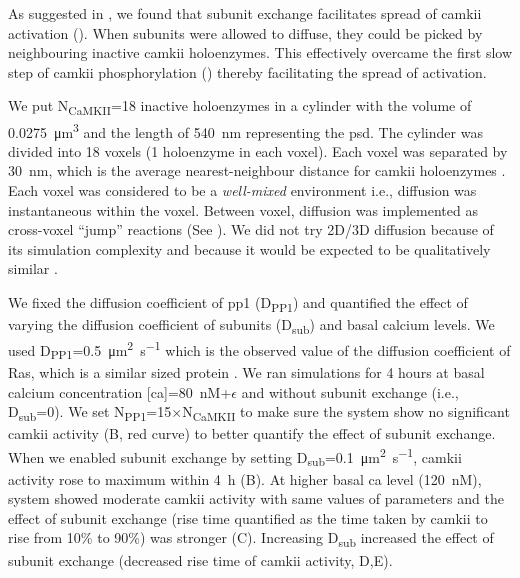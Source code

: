 \documentclass[9pt,lineno,doublespacing]{elife}
\newcommand\SUB[2]{#1\textsubscript{#2}}
\begin{document}
As suggested in \citep{stratton_activation-triggered_2014}, we found that
subunit exchange facilitates spread of \gls{camkii} activation
(). When subunits were allowed to diffuse, they
could be picked by neighbouring inactive \gls{camkii} holoenzymes.  This
effectively overcame the first slow step of \gls{camkii} phosphorylation
() thereby facilitating the spread of activation.

We put \SUB{N}{CaMKII}=18 inactive holoenzymes in a cylinder with the volume of
\SI{0.0275}{\cubic\micro\meter} and the length of \SI{540}{\nano\meter}
representing the \gls{psd}. The cylinder was divided into 18 voxels (1
holoenzyme in each voxel). Each voxel was separated by \SI{30}{\nano\meter},
which is the average nearest-neighbour distance for \gls{camkii} holoenzymes
\citep{feng_quantitative_2011}.  Each voxel was considered to be a
\emph{well-mixed} environment i.e., diffusion was instantaneous within the
voxel. Between voxel, diffusion was implemented as cross-voxel ``jump''
reactions (See ).  We did not try 2D/3D
diffusion because of its simulation complexity and because it would be expected
to be qualitatively similar \citep{fange_stochastic_2010}.

We fixed the diffusion coefficient of \gls{pp1} (\SUB{D}{PP1}) and quantified
the effect of varying the diffusion coefficient of subunits (\SUB{D}{sub}) and
basal calcium levels. We used
\SUB{D}{PP1}=\SI{0.5}{\micro\meter\squared\per\second} which is the observed
value of the diffusion coefficient of Ras, which is a similar sized protein
\citep{harvey_spread_2008}. We ran simulations for 4 hours at basal calcium
concentration [\gls{ca}]=\SI{80}{\nano M}+$\epsilon$ and without subunit exchange (i.e.,
\SUB{D}{sub}=0). We set \SUB{N}{PP1}=15$\times$\SUB{N}{CaMKII} to make sure the
system show no significant \gls{camkii} activity (B, red
curve) to better quantify the effect of subunit exchange. When we enabled
subunit exchange by setting
\SUB{D}{sub}=\SI{0.1}{\micro\meter\squared\per\second}, \gls{camkii} activity
rose to maximum within \SI{4}{\hour} (B). At
higher basal \gls{ca} level (\SI{120}{\nano M}), system showed moderate
\gls{camkii} activity with same values of parameters and the effect of subunit
exchange (rise time quantified as the time taken by \gls{camkii} to rise from
10\% to 90\%) was stronger (C). Increasing
\SUB{D}{sub} increased the effect of subunit exchange (decreased rise time of
\gls{camkii} activity, D,E).
\end{document}
